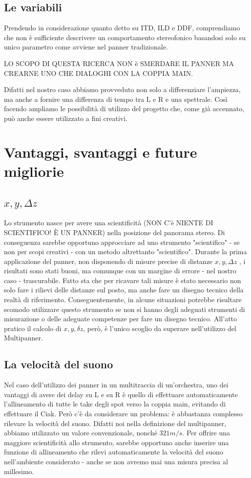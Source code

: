 \documentclass{article}
\begin{document}
    \subsection{Le variabili}
    Prendendo in considerazione quanto detto su ITD, ILD e DDF, comprendiamo che non è sufficiente descrivere un comportamento stereofonico basandosi solo su unico parametro come avviene nel panner tradizionale.
    
    LO SCOPO DI QUESTA RICERCA NON è SMERDARE IL PANNER MA CREARNE UNO CHE DIALOGHI CON LA COPPIA MAIN.
    
    Difatti nel nostro caso abbiamo provveduto non solo a differenziare l'ampiezza, ma anche a fornire una differenza di tempo tra L e R e una spettrale. Così facendo ampliamo le possibilità di utilizzo del progetto che, come già accennato, può anche essere utilizzato a fini creativi.

\section{Vantaggi, svantaggi e future migliorie} %

\subsection{$x, y, \Delta z$}
    Lo strumento nasce per avere una scientificità (NON C'è NIENTE DI SCIENTIFICO! È UN PANNER) nella posizione del panorama stereo. Di conseguenza sarebbe opportuno approcciare ad uno strumento "scientifico" - se non per scopi creativi - con un metodo altrettanto "scientifico".
    Durante la prima applicazione del panner, non disponendo di misure precise di distanze $x, y, \Delta z$ , i risultati sono stati buoni, ma comunque con un margine di errore - nel nostro caso - trascurabile.
    Fatto sta che per ricavare tali misure è stato necessario non solo fare i rilievi delle distanze sul posto, ma anche fare un disegno tecnico della realtà di riferimento. Conseguentemente, in alcune situazioni potrebbe risultare scomodo utilizzare questo strumento se non si hanno degli adeguati strumenti di misurazione o delle adeguate competenze per fare un disegno tecnico. All'atto pratico il calcolo di  $x, y, \delta z$, però, è l'unico scoglio da superare nell'utilizzo del Multipanner.

\subsection{La velocità del suono}
    Nel caso dell'utilizzo dei panner in un multitraccia di un'orchestra, uno dei vantaggi di avere dei delay su L e su R è quello di effettuare automaticamente l'allineamento di tutte le take degli spot verso la coppia main, evitando di effettuare il Ciak. Però c'è da considerare un problema: è abbastanza complesso rilevare la velocità del suono. Difatti noi nella definizione del multipanner, abbiamo utilizzato un valore convenzionale, nonché $321 m/s$. Per offrire una maggiore scientificità allo strumento, sarebbe opportuno anche inserire una funzione di allineamento che rilevi automaticamente la velocità del suono nell'ambiente considerato - anche se non avremo mai una misura precisa al millesimo.
    
\end{document}
